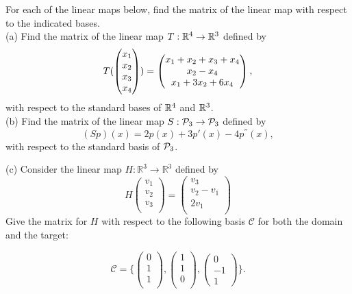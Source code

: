 \begin{question}
	\normalfont
	For each of the linear maps below, find the matrix of the linear map with respect to the indicated bases. \\
	
	
	\noindent (a) Find the matrix of the linear map $T: \real^4 \to \real^3$ defined by
	\[
	T(\ColVecFour{x_1}{x_2}{x_3}{x_4}) = \ColVecThree{x_1+x_2+x_3+x_4}{x_2-x_4}{x_1+3x_2+6x_4},
	\]
with respect to the standard bases of $\real^4$ and $\real^3$. \\

\vspace{.2cm}
\noindent (b) Find the matrix of the linear map $S: \P_3 \to \P_3$ defined by \[(Sp)(x) = 2p(x) + 3p'(x) - 4 p^{''}(x),\] with respect to the standard basis of $\P_3$. \\

\vspace{.2cm}
	
	\noindent	(c) Consider the linear map $H:\mathbb{R}^3 \rightarrow \mathbb{R}^3$ defined by $$H\left( \begin{array}{c}
v_1 \\
v_2 \\
v_3 \\
\end{array} \right)
= \left( \begin{array}{c}
 v_3\\
 v_2 - v_1\\
 2v_1 \\
 \end{array} \right)$$
\noindent Give the matrix for $H$ with respect to the following basis $\mathcal{C}$ for both the domain and the target: 

\[
\mathcal{C}= \Bigg\{\left( \begin{array}{c}
0 \\
1 \\
1\\
 \end{array}  \right), \left( \begin{array}{c}
1 \\
1 \\
0\\
 \end{array} \right), \left( \begin{array}{c}
0 \\
-1 \\
1\
 \end{array} \right)\Bigg\}.
 \]


\end{question}
